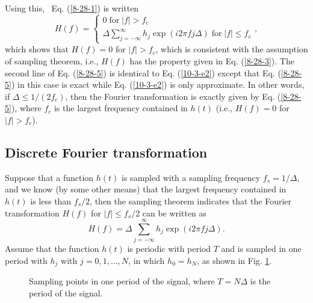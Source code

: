 \documentclass{article}
\newcommand{\tmop}[1]{\ensuremath{\operatorname{#1}}}
\begin{document}
Using this, \ Eq. (\ref{8-28-1}) is written
\begin{equation}
  \label{8-28-5} H (f) = \left\{ \begin{array}{l}
    0 \tmop{for} |f| > f_c\\
    \Delta \sum_{j = - \infty}^{\infty} h_j \exp (i 2 \pi f j \Delta)
    \tmop{for} |f| \leqslant f_c
  \end{array}, \right.
\end{equation}
which shows that $H (f) = 0$ for $|f| > f_c$, which is consistent with the
assumption of sampling theorem, i.e., $H (f)$ has the property given in Eq.
(\ref{8-28-3}). The second line of Eq. (\ref{8-28-5}) is identical to Eq.
(\ref{10-3-e2}) except that Eq. (\ref{8-28-5}) in this case is exact while Eq.
(\ref{10-3-e2}) is only approximate. In other words, if $\Delta \leqslant 1 /
(2 f_c)$, then the Fourier transformation is exactly given by Eq.
(\ref{8-28-5}), where $f_c$ is the largest frequency contained in $h (t)$
(i.e., $H (f) = 0$ for $|f| > f_c$).

\subsection{\label{9-29-8}Discrete Fourier transformation}

Suppose that a function $h (t)$ is sampled with a sampling frequency $f_s = 1
/ \Delta$, and we know (by some other means) that the largest frequency
contained in $h (t)$ is less than $f_s / 2$, then the sampling theorem
indicates that the Fourier transformation $H (f)$ for $|f| \leqslant f_s / 2$
can be written as
\begin{equation}
  \label{2-26-p1} H (f) = \Delta \sum_{j = - \infty}^{\infty} h_j \exp (i 2
  \pi f j \Delta) .
\end{equation}
Assume that the function $h (t)$ is periodic with period $T$ and is sampled in
one period with $h_j$ with $j = 0, 1, \ldots, N$, in which $h_0 = h_N$, as
shown in Fig. \ref{16-2-25}.

\begin{figure}[h]
  \caption{\label{16-2-25}Sampling points in one period of the signal, where
  $T = N \Delta$ is the period of the signal.}
\end{figure}
\end{document}
